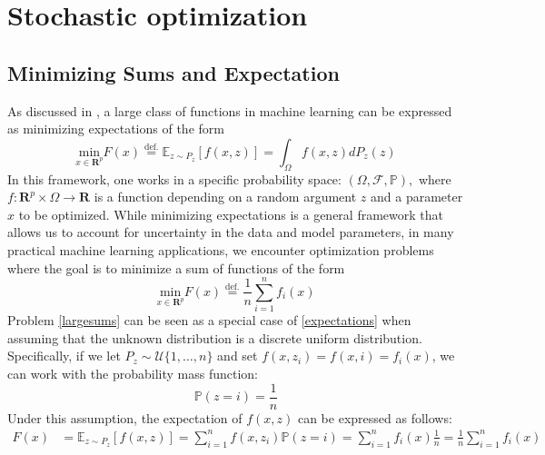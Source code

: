 \section{Stochastic optimization}
\subsection{Minimizing Sums and Expectation}
As discussed in \cite[20]{coursenotesML}, a large class of functions in machine learning can be expressed as minimizing expectations of the form
\begin{equation*}\label{expectations}\tag{4.2.1}
\underset{x \in \mathbf{R}^{p}}{\text{min}} F(x) \overset{\text{def.}}{=} \mathbb{E}_{z\sim P_{z}}[f(x,z)] = \int_{\Omega} f(x, z) dP_z(z)
\end{equation*}
In this framework, one works in a specific probability space: $\left(\Omega, \mathcal{F}, \mathbb{P}\right),$ where $f: \mathbf{R}^{p} \times \Omega \rightarrow \mathbf{R}$ is a function depending on a random argument $z$ and a parameter $x$ to be optimized.
While minimizing expectations is a general framework that allows us to account for uncertainty in the data and model parameters, in many practical machine learning applications, we encounter optimization problems where the goal is to minimize a sum of functions of the form
\begin{equation*}\label{largesums}\tag{4.2.2}
\underset{x \in \mathbf{R}^{p}}{\text{min}} F(x) \overset{\text{def.}}{=} \frac{1}{n} \sum_{i=1}^{n}f_{i}(x)
\end{equation*}Problem \ref{largesums} can be seen as a special case of \ref{expectations} when assuming that the unknown distribution is a discrete uniform distribution. Specifically, if we let $P_{z}\sim\mathcal{U}\{1,\ldots,n\}$ and set $f(x, z_i) = f(x, i) = f_{i}(x)$, we can work with the probability mass function:
\begin{equation*}
\mathbb{P}(z = i) = \frac{1}{n}
\end{equation*}
Under this assumption, the expectation of $f(x, z)$ can be expressed as follows:
\begin{align*}
F(x)
    &= \mathbb{E}_{z\sim P_{z}}[f(x,z)] = \sum_{i=1}^{n} f(x, z_i) \mathbb{P}(z = i) = \sum_{i=1}^{n} f_{i}(x) \frac{1}{n} = \frac{1}{n} \sum_{i=1}^{n} f_{i}(x)
\end{align*}
